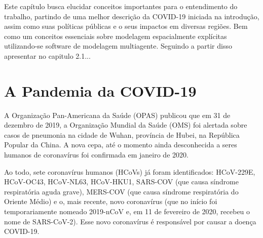 \newcommand{\texCommand}[1]{\texttt{\textbackslash{#1}}}%

\newcommand{\exemplo}[1]{%
\vspace{\baselineskip}%
\noindent\fbox{\begin{minipage}{\textwidth}#1\end{minipage}}%
\\\vspace{\baselineskip}}%

\newcommand{\exemploVerbatim}[1]{%
\vspace{\baselineskip}%
\noindent\fbox{\begin{minipage}{\textwidth}%
#1\end{minipage}}%
\\\vspace{\baselineskip}}%


Este capítulo busca elucidar conceitos importantes para o entendimento do trabalho, partindo de uma melhor descrição da COVID-19 iniciada na introdução, assim como suas políticas públicas e o seus impactos em diversas regiões. Bem como um conceitos essenciais sobre modelagem espacialmente explícitas utilizando-se software de modelagem multiagente. Seguindo a partir disso apresentar no capitulo 2.1...

\section{A Pandemia da COVID-19}

A Organização Pan-Americana da Saúde (OPAS) publicou que em 31 de dezembro de 2019, a Organização Mundial da Saúde (OMS) foi alertada sobre casos de pneumonia na cidade de Wuhan, província de Hubei, na República Popular da China. A nova cepa, até o momento ainda desconhecida a seres humanos de coronavírus foi confirmada em janeiro de 2020.

Ao todo, sete coronavírus humanos (HCoVs) já foram identificados: HCoV-229E, HCoV-OC43, HCoV-NL63, HCoV-HKU1, SARS-COV (que causa síndrome respiratória aguda grave), MERS-COV (que causa síndrome respiratória do Oriente Médio) e o, mais recente, novo coronavírus (que no início foi temporariamente nomeado 2019-nCoV e, em 11 de fevereiro de 2020, recebeu o nome de SARS-CoV-2). Esse novo coronavírus é responsável por causar a doença COVID-19.

